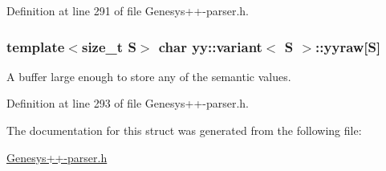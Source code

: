 Definition at line 291 of file Genesys++-\/parser.\-h.

\hypertarget{structyy_1_1variant_a888cad25e7084a89867ab29ab0837593}{
\subsubsection[{yyraw}]{\setlength{\rightskip}{0pt plus 5cm}template$<$size\-\_\-t S$>$ char {\bf yy\-::variant}$<$ S $>$\-::yyraw\mbox{[}S\mbox{]}}}\label{structyy_1_1variant_a888cad25e7084a89867ab29ab0837593}


A buffer large enough to store any of the semantic values. 



Definition at line 293 of file Genesys++-\/parser.\-h.



The documentation for this struct was generated from the following file\-:\begin{DoxyCompactItemize}
\item 
\hyperlink{_genesys_09_09-parser_8h}{Genesys++-\/parser.\-h}\end{DoxyCompactItemize}

